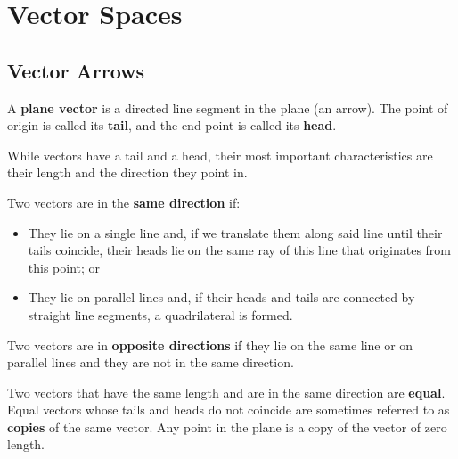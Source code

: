 
\chapter{Vector Spaces}
\section{Vector Arrows}
\begin{definition}\label{def:plane-vector}
    A \textbf{plane vector} is a directed line segment in the plane (an arrow). The point of origin is called its \textbf{tail}, and the end point is called its \textbf{head}.
\end{definition}

\begin{note}
    While vectors have a tail and a head, their most important characteristics are their length and the direction they point in.
\end{note}

\begin{definition}\label{def:same-direction}
    Two vectors are in the \textbf{same direction} if:
    \begin{itemize}
        \item They lie on a single line and, if we translate them along said line until their tails coincide, their heads lie on the same ray of this line that originates from this point; or
        \item They lie on parallel lines and, if their heads and tails are connected by straight line segments, a quadrilateral is formed.
    \end{itemize}
\end{definition}

\begin{definition}\label{def:opposite-directions}
    Two vectors are in \textbf{opposite directions} if they lie on the same line or on parallel lines and they are not in the same direction.
\end{definition}

\begin{definition}\label{def:equal-vectors}
    Two vectors that have the same length and are in the same direction are \textbf{equal}. Equal vectors whose tails and heads do not coincide are sometimes referred to as \textbf{copies} of the same vector. Any point in the plane is a copy of the vector of zero length.
\end{definition}


